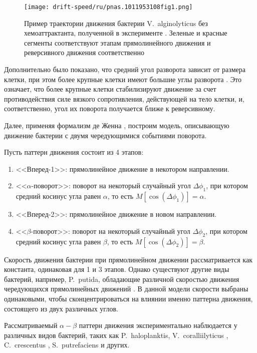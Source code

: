 \begin{figure}[ht]
    \centering
    \texttt{[image: drift-speed/ru/pnas.1011953108fig1.png]}
    \caption{
        Пример траектории движения бактерии V.~alginolyticus без хемоаттрактанта, полученной в эксперименте
        \cite{xie_bacterial_2011}. Зеленые и красные сегменты соответствуют этапам прямолинейного движения и реверсивного движения соответственно
    }
    \label{fig:vibrio-trajectories}
\end{figure}

Дополнительно было показано, что средний угол разворота зависит от размера клетки, при этом более крупные клетки имеют большие углы разворота \cite{taute_high-throughput_2015}. Это означает, что более крупные клетки стабилизируют движение за счет противодействия силе вязкого сопротивления, действующей на тело клетки, и, соответственно, угол их поворота получается ближе к реверсивному. 

Далее, применяя формализм де Женна \cite{de_gennes_chemotaxis_2004}, построим модель, описывающую движение бактерии с двумя чередующимися событиями поворота.

Пусть паттерн движения состоит из 4 этапов: 
\begin{enumerate}
  \item <<Вперед-1>>: прямолинейное движение в некотором направлении.
  \item <<$\alpha$-поворот>>: поворот на некоторый случайный угол $\Delta\phi_1$, при котором средний косинус угла равен $\alpha$, то есть $M[\cos (\Delta\phi_1)]=\alpha$.
  \item <<Вперед-2>>: прямолинейное движение в новом направлении.
  \item <<$\beta$-поворот>>: поворот на некоторый случайный угол $\Delta\phi_2$, при котором средний косинус угла равен $\beta$, то есть $M[\cos (\Delta\phi_2)]=\beta$.
\end{enumerate}

Скорость движения бактерии при прямолинейном движении рассматривается как константа, одинаковая для 1 и 3 этапов. Однако существуют другие виды бактерий, например, P.~putida, обладающие различной скоростью движения чередующихся прямолинейных движений \cite{theves_bacterial_2013}. В данной модели скорости выбраны одинаковыми, чтобы сконцентрироваться на влиянии именно паттерна движения, состоящего из двух различных углов.

Рассматриваемый $\alpha-\beta$ паттерн движения экспериментально наблюдается у различных видов бактерий, таких как P.~haloplanktis, V.~coralliilyticus \cite{son_bacteria_2013}, C.~crescentus \cite{liu_helical_2014}, S.~putrefaciens \cite{stocker_reverse_2011} и других. 

